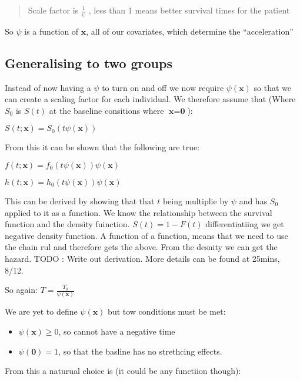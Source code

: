\documentclass[
  letterpaper,
  DIV=11,
  numbers=noendperiod]{scrreprt}
\providecommand{\tightlist}{%
  \setlength{\itemsep}{0pt}\setlength{\parskip}{0pt}}\usepackage{longtable,booktabs,array}
\begin{document}
\begin{quote}
Scale factor is \(\frac{1}{\psi}\) , less than 1 means better survival
times for the patient
\end{quote}

So \(\psi\) is a function of \(\textbf{x}\), all of our covariates,
which determine the ``acceleration''

\hypertarget{generalising-to-two-groups}{%
\subsection{Generalising to two
groups}\label{generalising-to-two-groups}}

Instead of now having a \(\psi\) to turn on and off we now require
\(\psi(\textbf{x})\) so that we can create a scaling factor for each
individual. We therefore assume that (Where \(S_0\) is \(S(t)\) at the
baseline consitions where \(\textbf{x} = \textbf{0}\)):

\(S(t;\textbf{x}) = S_0(t\psi(\textbf{x}))\)

From this it can be shown that the following are true:

\(f(t;\textbf{x}) = f_0(t\psi(\textbf{x}))\psi(\textbf{x})\)

\(h(t;\textbf{x}) = h_0(t\psi(\textbf{x}))\psi(\textbf{x})\)

This can be derived by showing that that \(t\) being multiplie by
\(\psi\) and has \(S_0\) applied to it as a function. We know the
relationship between the survival function and the density fuinction.
\(S(t) = 1- F(t)\) differentiatiing we get negative density function. A
function of a function, means that we need to use the chain rul and
therefore gets the above. From the desnity we can get the hazard. TODO :
Write out derivation. More details can be found at 25mins, 8/12.

So again: \(T = \frac{T_0}{\psi(\textbf{x})}\)

We are yet to define \(\psi(\textbf{x})\) but tow conditions must be
met:

\begin{itemize}
\tightlist
\item
  \(\psi(\textbf{x})\geq 0\), so cannot have a negative time
\item
  \(\psi(\textbf{0}) = 1\), so that the basline has no strethcing
  effects.
\end{itemize}

From this a naturual choice is (it could be any functiion though):
\end{document}
